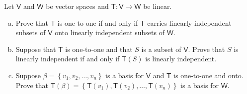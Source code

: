 Let $\mathsf{V}$ and $\mathsf{W}$ be vector spaces and
$\mathsf{T}\colon\mathsf{V} \to \mathsf{W}$ be linear.
\begin{enumerate}[(a)]
\item Prove that $\mathsf{T}$ is one-to-one if and only if
  $\mathsf{T}$ carries linearly independent subsets of $\mathsf{V}$
  onto linearly independent subsets of $\mathsf{W}$.
\item Suppose that $\mathsf{T}$ is one-to-one and that $S$ is a subset
  of $\mathsf{V}$. Prove that $S$ is linearly independent if and only
  if $\mathsf{T}(S)$ is linearly independent.
\item Suppose $\beta = \left\{v_1,v_2,\dots,v_n\right\}$ is a basis
  for $\mathsf{V}$ and $\mathsf{T}$ is one-to-one and onto. Prove that
  $\mathsf{T}(\beta) =
  \left\{\mathsf{T}(v_1),\mathsf{T}(v_2),\dots,\mathsf{T}(v_n)\right\}$
  is a basis for $\mathsf{W}$.
\end{enumerate}
